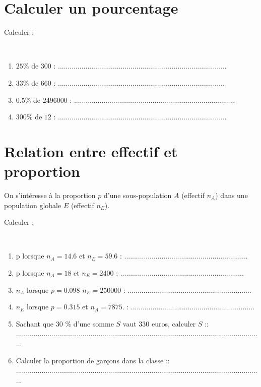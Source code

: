 	\section{Calculer un pourcentage}
	Calculer :
	\begin{questions}
		
	
		\question[2] \ 
		
		\begin{enumerate}[label=\alph*)]
			
			\item $25 \%$ de $\num{300}$ :  ......................................................................................
			\item $33 \%$ de $\num{660}$ : .....................................................................................
			\item $\num{0.5} \%$ de $\num{2496000}$ : ..................................................................................
			\item $300 \%$ de $\num{12}$ : ......................................................................................
		\end{enumerate}
	\end{questions}
	
	
\section{Relation entre effectif et proportion}

On s'intéresse à la proportion $p$ d'une sous-population $A$ (effectif $n_A$) dans une population globale $E$ (effectif $n_E$).

Calculer :
\begin{questions}

	
	\question[6] \
	
	\begin{enumerate}[label=\alph*)]
		
		\item p lorsque $n_A=\num{14.6}$ et $n_E= \num{59.6} $ :  ...............................................................
		\item p lorsque $n_A=\num{18}$ et $n_E= \num{2400}$ : ...............................................................
		\item $n_A$ lorsque $p=\num{0.098}$ $n_E= \num{250000}$ : ...............................................................
		\item $n_E$ lorsque $p=\num{0.315} $ et $n_A=\num{7875}.$ : ...............................................................
		\item Sachant que 30 \% d'une somme $S$ vaut 330 euros, calculer $S$ ::\\ ..............................................................................................................................
		\item Calculer la proportion de garçons dans la classe ::\\ ..............................................................................................................................
	\end{enumerate}
\end{questions}


